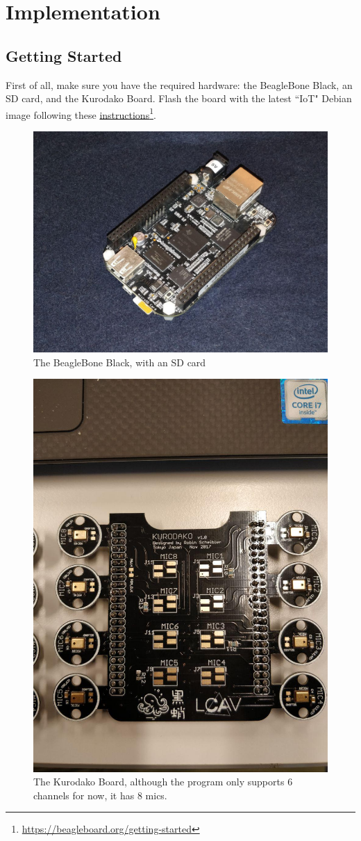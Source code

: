 \documentclass[]{report}
\begin{document}
\hypertarget{implementation}{%
\chapter{Implementation}\label{implementation}}

\hypertarget{getting-started}{%
\section{Getting Started}\label{getting-started}}

First of all, make sure you have the required hardware: the BeagleBone
Black, an SD card, and the Kurodako Board. Flash the board with the
latest ``IoT" Debian image following these
\href{https://beagleboard.org/getting-started}{instructions}\footnote{\url{https://beagleboard.org/getting-started}}.

\begin{figure}[h]
\centering
\includegraphics[width=0.9\linewidth]{Pictures/BBB.jpg}
\caption{The BeagleBone Black, with an SD card}
\end{figure}

\begin{figure}[h]
\centering
\includegraphics[width=0.4\linewidth]{Pictures/kurodako.jpg}
\caption{The Kurodako Board, although the program only supports 6
channels for now, it has 8 mics.}
\end{figure}
\end{document}
